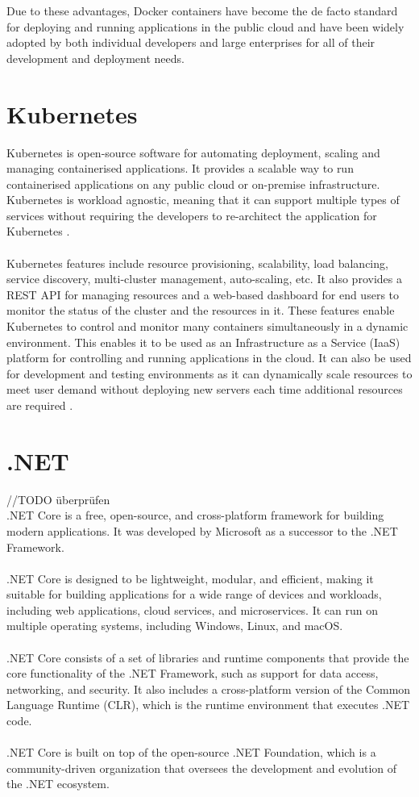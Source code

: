 \documentclass[BIF,Master,nenglish]{twbook}
\begin{document}
\noindent
Due to these advantages, Docker containers have become the de facto standard for deploying and running applications in the public cloud and have been widely adopted by both individual developers and large enterprises for all of their development and deployment needs.


\section{Kubernetes}
Kubernetes is open-source software for automating deployment, scaling and managing containerised applications. It provides a scalable way to run containerised applications on any public cloud or on-premise infrastructure. Kubernetes is workload agnostic, meaning that it can support multiple types of services without requiring the developers to re-architect the application for Kubernetes \cite{luk2018}.
\\
\\
Kubernetes features include resource provisioning, scalability, load balancing, service discovery, multi-cluster management, auto-scaling, etc. It also provides a REST API for managing resources and a web-based dashboard for end users to monitor the status of the cluster and the resources in it. These features enable Kubernetes to control and monitor many containers simultaneously in a dynamic environment. This enables it to be used as an Infrastructure as a Service (IaaS) platform for controlling and running applications in the cloud. It can also be used for development and testing environments as it can dynamically scale resources to meet user demand without deploying new servers each time additional resources are required \cite{kubernetes}.

\section{.NET}
//TODO überprüfen
\\
.NET Core is a free, open-source, and cross-platform framework for building modern applications. It was developed by Microsoft as a successor to the .NET Framework.
\\
\\
.NET Core is designed to be lightweight, modular, and efficient, making it suitable for building applications for a wide range of devices and workloads, including web applications, cloud services, and microservices. It can run on multiple operating systems, including Windows, Linux, and macOS.
\\
\\
.NET Core consists of a set of libraries and runtime components that provide the core functionality of the .NET Framework, such as support for data access, networking, and security. It also includes a cross-platform version of the Common Language Runtime (CLR), which is the runtime environment that executes .NET code.
\\
\\
.NET Core is built on top of the open-source .NET Foundation, which is a community-driven organization that oversees the development and evolution of the .NET ecosystem.
\end{document}
